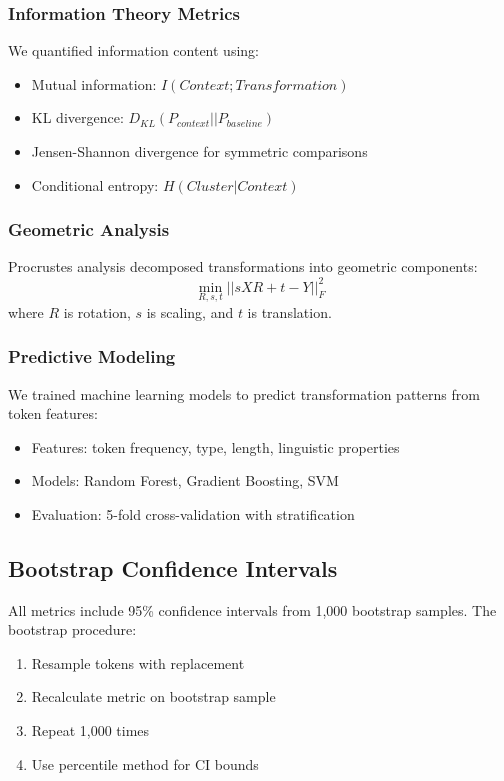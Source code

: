 \subsubsection{Information Theory Metrics}
We quantified information content using:
\begin{itemize}
\item Mutual information: $I(Context; Transformation)$
\item KL divergence: $D_{KL}(P_{context} || P_{baseline})$
\item Jensen-Shannon divergence for symmetric comparisons
\item Conditional entropy: $H(Cluster|Context)$
\end{itemize}

\subsubsection{Geometric Analysis}
Procrustes analysis decomposed transformations into geometric components:
\begin{equation}
\min_{R,s,t} ||sXR + t - Y||_F^2
\end{equation}
where $R$ is rotation, $s$ is scaling, and $t$ is translation.

\subsubsection{Predictive Modeling}
We trained machine learning models to predict transformation patterns from token features:
\begin{itemize}
\item Features: token frequency, type, length, linguistic properties
\item Models: Random Forest, Gradient Boosting, SVM
\item Evaluation: 5-fold cross-validation with stratification
\end{itemize}

\subsection{Bootstrap Confidence Intervals}

All metrics include 95\% confidence intervals from 1,000 bootstrap samples. The bootstrap procedure:
\begin{enumerate}
\item Resample tokens with replacement
\item Recalculate metric on bootstrap sample
\item Repeat 1,000 times
\item Use percentile method for CI bounds
\end{enumerate}

